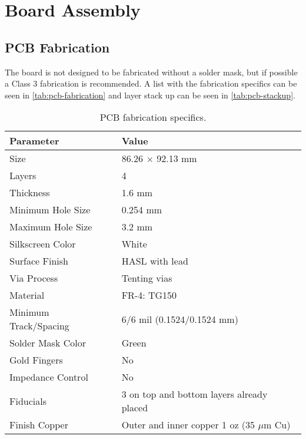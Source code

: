 %
%
%
%
%

%
%
%
%
%
%

\chapter{Board Assembly} \label{ch:assembly}

\section{PCB Fabrication}

The board is not designed to be fabricated without a solder mask, but if possible a Class 3 fabrication is recommended. A list with the fabrication specifics can be seen in \autoref{tab:pcb-fabrication} and layer stack up can be seen in \autoref{tab:pcb-stackup}.

\begin{table}[!h]
    \centering
    \begin{tabular}{L{0.5\columnwidth}L{0.5\columnwidth}}
        \toprule[1.5pt]
        \textbf{Parameter}      & \textbf{Value} \\
        \midrule
        Size                    & 86.26 $\times$ 92.13 mm \\
        Layers                  & 4 \\
        Thickness               & 1.6 mm \\
        Minimum Hole Size       & 0.254 mm \\
        Maximum Hole Size       & 3.2 mm \\
        Silkscreen Color        & White \\
        Surface Finish          & HASL with lead \\
        Via Process             & Tenting vias \\
        Material                & FR-4: TG150 \\
        Minimum Track/Spacing   & 6/6 mil (0.1524/0.1524 mm)\\
        Solder Mask Color       & Green \\
        Gold Fingers            & No \\
        Impedance Control       & No \\   
        Fiducials               & 3 on top and bottom layers already placed \\
        Finish Copper           & Outer and inner copper 1 oz (35 $\mu$m Cu) \\
        \bottomrule[1.5pt]
    \end{tabular}
    \caption{PCB fabrication specifics.}
    \label{tab:pcb-fabrication}
\end{table}


